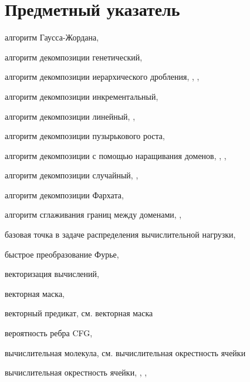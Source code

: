 \newpage

\section*{Предметный указатель}

алгоритм Гаусса-Жордана, \pageref{term:alg_gauss_zhordan}

алгоритм декомпозиции генетический, \pageref{term:alg_decomp_gen}

алгоритм декомпозиции иерархического дробления, \pageref{term:alg_decomp_hierarch}, \pageref{term:alg_decomp_hierarch2}, \pageref{term:alg_decomp_hierarch3}

алгоритм декомпозиции инкрементальный, \pageref{term:alg_decomp_inc}

алгоритм декомпозиции линейный, \pageref{term:alg_decomp_linear}, \pageref{term:alg_decomp_linear2}

алгоритм декомпозиции пузырькового роста, \pageref{term:alg_decomp_bubble}

алгоритм декомпозиции с помощью наращивания доменов, \pageref{term:alg_decomp_rgrow}, \pageref{term:alg_decomp_rgrow2}, \pageref{term:alg_decomp_rgrow3}

алгоритм декомпозиции случайный, \pageref{term:alg_decomp_random}, \pageref{term:alg_decomp_random2}

алгоритм декомпозиции Фархата, \pageref{term:alg_decomp_farhat}

алгоритм сглаживания границ между доменами, \pageref{term:alg_smooth_domains_border}, \pageref{term:alg_smooth_domains_border2}

базовая точка в задаче распределения вычислительной нагрузки, \pageref{term:distr_base_point}

быстрое преобразование Фурье, \pageref{term:furier_transform}

векторизация вычислений, \pageref{term:vectorization}

векторная маска, \pageref{term:vector_mask}

векторный предикат, см. векторная маска

вероятность ребра CFG, \pageref{term:edge_prob}

вычислительная молекула, см. вычислительная окрестность ячейки

вычислительная окрестность ячейки, \pageref{term:cell_calc_template}, \pageref{term:cell_calc_template2}, \pageref{term:cell_calc_template3}

